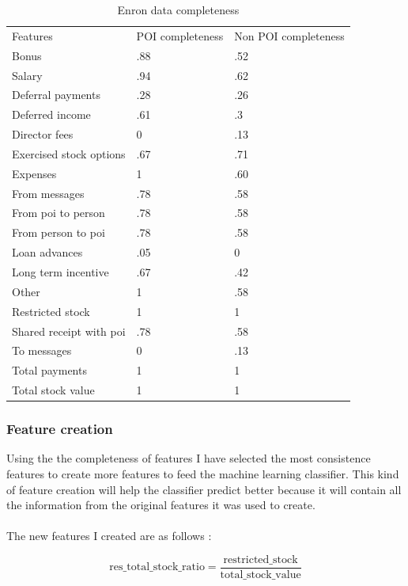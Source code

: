 \documentclass[12pt]{article}%
\begin{document}
\newpage
\begin{table}[!htb]
\centering
\caption{Enron data completeness}
\label{my-label}
\begin{tabular}{lll}
 Features & POI completeness & Non POI completeness \\
 Bonus & .88 & .52 \\
 Salary & .94 & .62 \\
 Deferral payments & .28 & .26 \\
 Deferred income & .61 & .3 \\
 Director fees & 0 & .13 \\
 Exercised stock options & .67 & .71 \\
 Expenses & 1 & .60 \\
 From messages & .78 & .58 \\
 From poi to person & .78 & .58 \\
 From person to poi & .78 & .58 \\
 Loan advances & .05 & 0 \\
 Long term incentive & .67 & .42 \\
 Other & 1 & .58 \\
 Restricted stock & 1 & 1 \\
 Shared receipt with poi & .78 & .58 \\
 To messages & 0 & .13 \\
 Total payments & 1 & 1 \\
 Total stock value & 1 & 1 \\
 
\end{tabular}
\end{table}


\subsubsection*{Feature creation}

Using the the completeness of features I have selected the most consistence features to create more features to feed the machine learning classifier. This kind of feature creation will help the classifier predict better because it will contain all the information from the original features it was used to create.
\\
\\
The new features I created are as follows :

\begin{equation}
\mathrm{res\_total\_stock\_ratio} = \frac{\mathrm{restricted\_stock}}{\mathrm{total\_stock\_value}}
\end{equation}
\end{document}
